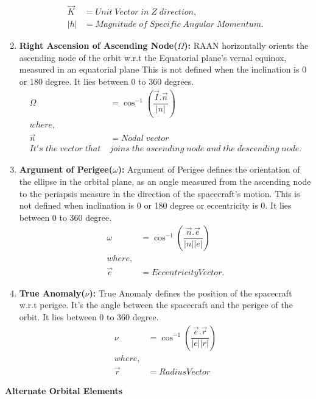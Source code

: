 \begin{enumerate}
\begin{align}
\overrightarrow{K}&=Unit\;Vector\;in\;Z\;direction, \nonumber  \\
|h|&=Magnitude\;of\;Specific\;Angular\;Momentum. \nonumber
\end{align}
\item \textbf{Right Ascension of Ascending Node($\Omega$):} RAAN horizontally orients the ascending node of the orbit w.r.t the Equatorial plane’s vernal equinox, measured in an equatorial plane This is not defined when the inclination is 0 or 180 degree. It lies between 0 to 360 degrees.
\begin{align}
\Omega &= \cos^{-1}\left(\dfrac{\overrightarrow{I}.\overrightarrow{n}}{|n|}\right)\\
where, \nonumber \\
\overrightarrow{n}&= Nodal\;vector \nonumber\\
It's\;the\;vector\;that\;&joins\;the\;ascending\;node\;and\;the\;descending\;node. \nonumber
\end{align}
\item \textbf{Argument of Perigee($\omega$):} Argument of Perigee defines the orientation of the ellipse in the orbital plane, as an angle measured from the ascending node to the periapsis measure in the direction of the spacecraft’s motion. This is not defined when inclination is 0 or 180 degree or eccentricity is 0. It lies between 0 to 360 degree.
\begin{align}
\omega &= \cos^{-1}\left(\dfrac{\overrightarrow{n}.\overrightarrow{e}}{|n||e|}\right)\\
where, \nonumber\\
\overrightarrow{e}&=Eccentricity Vector. \nonumber
\end{align}
\item \textbf{True Anomaly($\nu$):} True Anomaly defines the position of the spacecraft w.r.t perigee. It’s the angle between the spacecraft and the perigee of the orbit. It lies between 0 to 360 degree. 
\begin{align}
\nu &= \cos^{-1}\left(\dfrac{\overrightarrow{e}.\overrightarrow{r}}{|e||r|}\right)\\
where,\nonumber\\
\overrightarrow{r}&=Radius Vector\nonumber
\end{align}
\end{enumerate}
\large \textbf{Alternate Orbital Elements}
\normalsize
